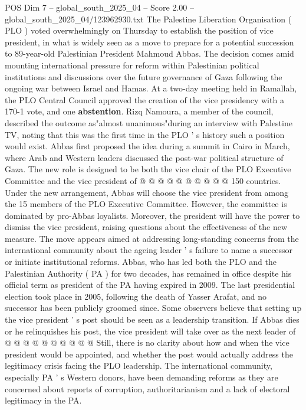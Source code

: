 \begin{textsample}{POS Dim 7 – global\_south\_2025\_04 – Score 2.00 – global\_south\_2025\_04/123962930.txt}  \label{ex:f7_pos_141}
The Palestine Liberation Organisation ( PLO ) voted overwhelmingly on Thursday to establish the position of vice president, in what is widely seen as a move to prepare for a potential succession to 89-year-old Palestinian President Mahmoud Abbas.
The decision comes amid mounting international pressure for reform within Palestinian political institutions and discussions over the future governance of Gaza following the ongoing war between Israel and Hamas.
At a two-day meeting held in Ramallah, the PLO Central Council approved the creation of the vice presidency with a 170-1 vote, and one \textbf{abstention}.
Rizq Namoura, a member of the council, described the outcome as"almost unanimous"during an interview with Palestine TV, noting that this was the first time in the PLO ' s history such a position would exist.
Abbas first proposed the idea during a summit in Cairo in March, where Arab and Western leaders discussed the post-war political structure of Gaza.
The new role is designed to be both the vice chair of the PLO Executive Committee and the vice president of @ @ @ @ @ @ @ @ @ @ 150 countries.
Under the new arrangement, Abbas will choose the vice president from among the 15 members of the PLO Executive Committee.
However, the committee is dominated by pro-Abbas loyalists.
Moreover, the president will have the power to dismiss the vice president, raising questions about the effectiveness of the new measure.
The move appears aimed at addressing long-standing concerns from the international community about the ageing leader ' s failure to name a successor or initiate institutional reforms.
Abbas, who has led both the PLO and the Palestinian Authority ( PA ) for two decades, has remained in office despite his official term as president of the PA having expired in 2009.
The last presidential election took place in 2005, following the death of Yasser Arafat, and no successor has been publicly groomed since.
Some observers believe that setting up the vice president ' s post should be seen as a leadership transition.
If Abbas dies or he relinquishes his post, the vice president will take over as the next leader of @ @ @ @ @ @ @ @ @ @ Still, there is no clarity about how and when the vice president would be appointed, and whether the post would actually address the legitimacy crisis facing the PLO leadership.
The international community, especially PA ' s Western donors, have been demanding reforms as they are concerned about reports of corruption, authoritarianism and a lack of electoral legitimacy in the PA.

\end{textsample}
